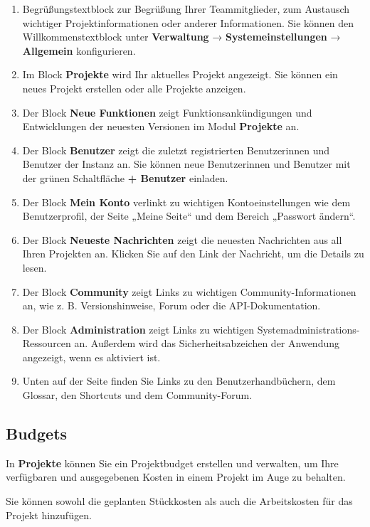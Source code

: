\documentclass[
  letterpaper,
  DIV=11,
  numbers=noendperiod]{scrreprt}
\providecommand{\tightlist}{%
  \setlength{\itemsep}{0pt}\setlength{\parskip}{0pt}}\usepackage{longtable,booktabs,array}
\begin{document}
\begin{enumerate}
\def\labelenumi{\arabic{enumi}.}
\tightlist
\item
  Begrüßungstextblock zur Begrüßung Ihrer Teammitglieder, zum Austausch
  wichtiger Projektinformationen oder anderer Informationen. Sie können
  den Willkommenstextblock unter \textbf{Verwaltung} →
  \textbf{Systemeinstellungen} → \textbf{Allgemein} konfigurieren.
\item
  Im Block \textbf{Projekte} wird Ihr aktuelles Projekt angezeigt. Sie
  können ein neues Projekt erstellen oder alle Projekte anzeigen.
\item
  Der Block \textbf{Neue Funktionen} zeigt Funktionsankündigungen und
  Entwicklungen der neuesten Versionen im Modul \textbf{Projekte} an.
\item
  Der Block \textbf{Benutzer} zeigt die zuletzt registrierten
  Benutzerinnen und Benutzer der Instanz an. Sie können neue
  Benutzerinnen und Benutzer mit der grünen Schaltfläche \textbf{+
  Benutzer} einladen.
\item
  Der Block \textbf{Mein Konto} verlinkt zu wichtigen Kontoeinstellungen
  wie dem Benutzerprofil, der Seite „Meine Seite`` und dem Bereich
  „Passwort ändern``.
\item
  Der Block \textbf{Neueste Nachrichten} zeigt die neuesten Nachrichten
  aus all Ihren Projekten an. Klicken Sie auf den Link der Nachricht, um
  die Details zu lesen.
\item
  Der Block \textbf{Community} zeigt Links zu wichtigen
  Community-Informationen an, wie z. B. Versionshinweise, Forum oder die
  API-Dokumentation.
\item
  Der Block \textbf{Administration} zeigt Links zu wichtigen
  Systemadministrations-Ressourcen an. Außerdem wird das
  Sicherheitsabzeichen der Anwendung angezeigt, wenn es aktiviert ist.
\item
  Unten auf der Seite finden Sie Links zu den Benutzerhandbüchern, dem
  Glossar, den Shortcuts und dem Community-Forum.
\end{enumerate}

\subsection{Budgets}\label{budgets}

In \textbf{Projekte} können Sie ein Projektbudget erstellen und
verwalten, um Ihre verfügbaren und ausgegebenen Kosten in einem Projekt
im Auge zu behalten.

Sie können sowohl die geplanten Stückkosten als auch die Arbeitskosten
für das Projekt hinzufügen.
\end{document}
